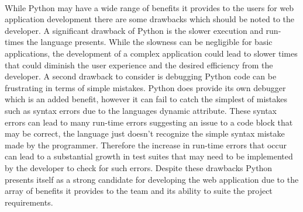 \documentclass[onecolumn, draftclsnofoot,10pt, compsoc]{IEEEtran}
\begin{document}
 \\	
	\indent While Python may have a wide range of benefits it provides to the users for web application development there are some drawbacks which should be noted to the developer. A significant drawback of Python is the slower execution and run-times the language presents. While the slowness can be negligible for basic applications, the development of a complex application could lead to slower times that could diminish the user experience and the desired efficiency from the developer. A second drawback to consider is debugging Python code can be frustrating in terms of simple mistakes. Python does provide its own debugger which is an added benefit, however it can fail to catch the simplest of mistakes such as syntax errors due to the languages dynamic attribute. These syntax errors can lead to many run-time errors suggesting an issue to a code block that may be correct, the language just doesn’t recognize the simple syntax mistake made by the programmer.  Therefore the increase in run-time errors that occur can lead to a substantial growth in test suites that may need to be implemented by the developer to check for such errors. Despite these drawbacks Python presents itself as a strong candidate for developing the web application due to the array of benefits it provides to the team and its ability to suite the project requirements. 
\end{document}
